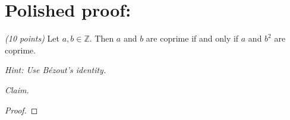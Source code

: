 \documentclass[12pt]{article}
\begin{document}
\section*{Polished proof:} 

\emph{(10 points)} Let \( a, b \in \mathbb{Z} \). Then \( a \) and \( b \) are coprime if and only if \( a \) and \( b^2 \) are coprime.

\emph{Hint: Use B\'ezout's identity.}

\noindent \emph{Claim.}

\begin{proof}
\end{proof}
\end{document}
